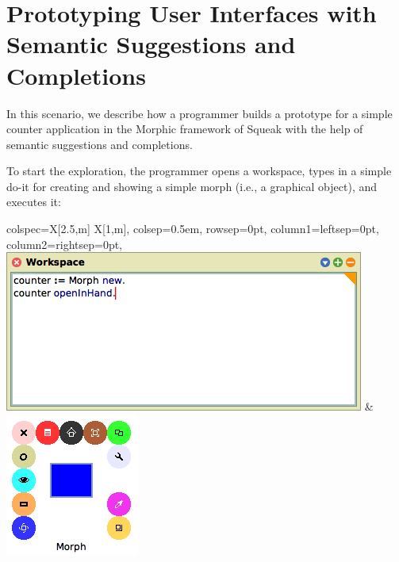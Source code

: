
\section{Prototyping User Interfaces with Semantic Suggestions and Completions}
\label{sec:application/suggestions}

In this scenario, we describe how a programmer builds a prototype for a simple counter application in the Morphic framework of Squeak with the help of semantic suggestions and completions.

To start the exploration, the programmer opens a workspace, types in a simple do-it for creating and showing a simple morph (i.e., a graphical object), and executes it:

\begin{center}
	\begin{tblr}{
		colspec={X[2.5,m] X[1,m]},
		colsep=0.5em,
		rowsep=0pt,
		column{1}={leftsep=0pt},
		column{2}={rightsep=0pt},
	}
		\includegraphics[width=\linewidth]{01_suggestions/workspace_start.png} & %
		\includegraphics[width=\linewidth]{01_suggestions/app_start.png} %
	\end{tblr}
\end{center}

